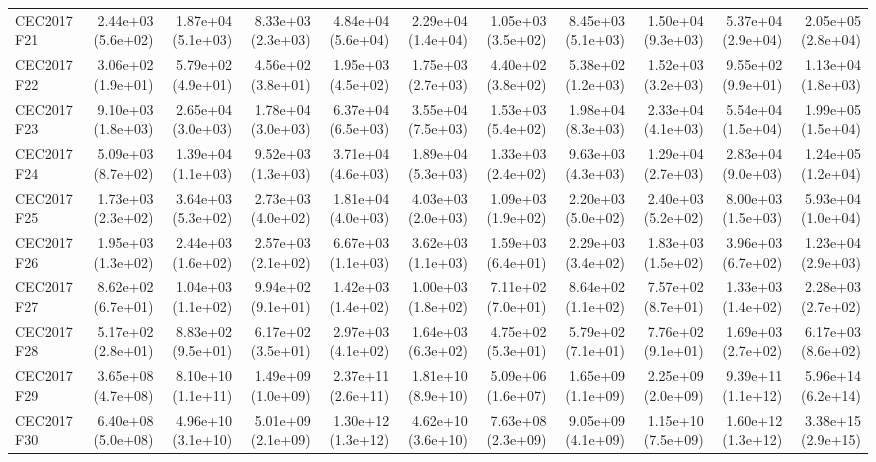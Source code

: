 \begin{longtable}{lrrrrrrrrrr}
CEC2017 F21 & 2.44e+03 (5.6e+02) & 1.87e+04 (5.1e+03) & 8.33e+03 (2.3e+03) & 4.84e+04 (5.6e+04) & 2.29e+04 (1.4e+04) & 1.05e+03 (3.5e+02) & 8.45e+03 (5.1e+03) & 1.50e+04 (9.3e+03) & 5.37e+04 (2.9e+04) & 2.05e+05 (2.8e+04) \\
CEC2017 F22 & 3.06e+02 (1.9e+01) & 5.79e+02 (4.9e+01) & 4.56e+02 (3.8e+01) & 1.95e+03 (4.5e+02) & 1.75e+03 (2.7e+03) & 4.40e+02 (3.8e+02) & 5.38e+02 (1.2e+03) & 1.52e+03 (3.2e+03) & 9.55e+02 (9.9e+01) & 1.13e+04 (1.8e+03) \\
CEC2017 F23 & 9.10e+03 (1.8e+03) & 2.65e+04 (3.0e+03) & 1.78e+04 (3.0e+03) & 6.37e+04 (6.5e+03) & 3.55e+04 (7.5e+03) & 1.53e+03 (5.4e+02) & 1.98e+04 (8.3e+03) & 2.33e+04 (4.1e+03) & 5.54e+04 (1.5e+04) & 1.99e+05 (1.5e+04) \\
CEC2017 F24 & 5.09e+03 (8.7e+02) & 1.39e+04 (1.1e+03) & 9.52e+03 (1.3e+03) & 3.71e+04 (4.6e+03) & 1.89e+04 (5.3e+03) & 1.33e+03 (2.4e+02) & 9.63e+03 (4.3e+03) & 1.29e+04 (2.7e+03) & 2.83e+04 (9.0e+03) & 1.24e+05 (1.2e+04) \\
CEC2017 F25 & 1.73e+03 (2.3e+02) & 3.64e+03 (5.3e+02) & 2.73e+03 (4.0e+02) & 1.81e+04 (4.0e+03) & 4.03e+03 (2.0e+03) & 1.09e+03 (1.9e+02) & 2.20e+03 (5.0e+02) & 2.40e+03 (5.2e+02) & 8.00e+03 (1.5e+03) & 5.93e+04 (1.0e+04) \\
CEC2017 F26 & 1.95e+03 (1.3e+02) & 2.44e+03 (1.6e+02) & 2.57e+03 (2.1e+02) & 6.67e+03 (1.1e+03) & 3.62e+03 (1.1e+03) & 1.59e+03 (6.4e+01) & 2.29e+03 (3.4e+02) & 1.83e+03 (1.5e+02) & 3.96e+03 (6.7e+02) & 1.23e+04 (2.9e+03) \\
CEC2017 F27 & 8.62e+02 (6.7e+01) & 1.04e+03 (1.1e+02) & 9.94e+02 (9.1e+01) & 1.42e+03 (1.4e+02) & 1.00e+03 (1.8e+02) & 7.11e+02 (7.0e+01) & 8.64e+02 (1.1e+02) & 7.57e+02 (8.7e+01) & 1.33e+03 (1.4e+02) & 2.28e+03 (2.7e+02) \\
CEC2017 F28 & 5.17e+02 (2.8e+01) & 8.83e+02 (9.5e+01) & 6.17e+02 (3.5e+01) & 2.97e+03 (4.1e+02) & 1.64e+03 (6.3e+02) & 4.75e+02 (5.3e+01) & 5.79e+02 (7.1e+01) & 7.76e+02 (9.1e+01) & 1.69e+03 (2.7e+02) & 6.17e+03 (8.6e+02) \\
CEC2017 F29 & 3.65e+08 (4.7e+08) & 8.10e+10 (1.1e+11) & 1.49e+09 (1.0e+09) & 2.37e+11 (2.6e+11) & 1.81e+10 (8.9e+10) & 5.09e+06 (1.6e+07) & 1.65e+09 (1.1e+09) & 2.25e+09 (2.0e+09) & 9.39e+11 (1.1e+12) & 5.96e+14 (6.2e+14) \\
CEC2017 F30 & 6.40e+08 (5.0e+08) & 4.96e+10 (3.1e+10) & 5.01e+09 (2.1e+09) & 1.30e+12 (1.3e+12) & 4.62e+10 (3.6e+10) & 7.63e+08 (2.3e+09) & 9.05e+09 (4.1e+09) & 1.15e+10 (7.5e+09) & 1.60e+12 (1.3e+12) & 3.38e+15 (2.9e+15) \\

\end{longtable}
